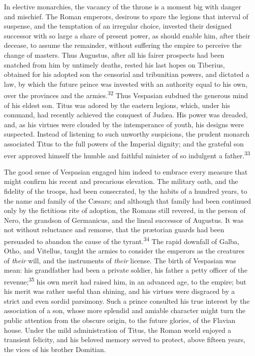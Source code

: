 In elective monarchies, the vacancy of the throne is a moment big
with danger and mischief. The Roman emperors, desirous to spare
the legions that interval of suspense, and the temptation of an
irregular choice, invested their designed successor with so large
a share of present power, as should enable him, after their
decease, to assume the remainder, without suffering the empire to
perceive the change of masters. Thus Augustus, after all his
fairer prospects had been snatched from him by untimely deaths,
rested his last hopes on Tiberius, obtained for his adopted son
the censorial and tribunitian powers, and dictated a law, by
which the future prince was invested with an authority equal to
his own, over the provinces and the armies.\textsuperscript{32} Thus Vespasian
subdued the generous mind of his eldest son. Titus was adored by
the eastern legions, which, under his command, had recently
achieved the conquest of Judæa. His power was dreaded, and, as
his virtues were clouded by the intemperance of youth, his
designs were suspected. Instead of listening to such unworthy
suspicions, the prudent monarch associated Titus to the full
powers of the Imperial dignity; and the grateful son ever
approved himself the humble and faithful minister of so indulgent
a father.\textsuperscript{33}



The good sense of Vespasian engaged him indeed to embrace every
measure that might confirm his recent and precarious elevation.
The military oath, and the fidelity of the troops, had been
consecrated, by the habits of a hundred years, to the name and
family of the Cæsars; and although that family had been continued
only by the fictitious rite of adoption, the Romans still
revered, in the person of Nero, the grandson of Germanicus, and
the lineal successor of Augustus. It was not without reluctance
and remorse, that the prætorian guards had been persuaded to
abandon the cause of the tyrant.\textsuperscript{34} The rapid downfall of Galba,
Otho, and Vitellus, taught the armies to consider the emperors as
the creatures of \textit{their} will, and the instruments of \textit{their}
license. The birth of Vespasian was mean: his grandfather had
been a private soldier, his father a petty officer of the
revenue;\textsuperscript{35} his own merit had raised him, in an advanced age, to
the empire; but his merit was rather useful than shining, and his
virtues were disgraced by a strict and even sordid parsimony.
Such a prince consulted his true interest by the association of a
son, whose more splendid and amiable character might turn the
public attention from the obscure origin, to the future glories,
of the Flavian house. Under the mild administration of Titus, the
Roman world enjoyed a transient felicity, and his beloved memory
served to protect, above fifteen years, the vices of his brother
Domitian.

